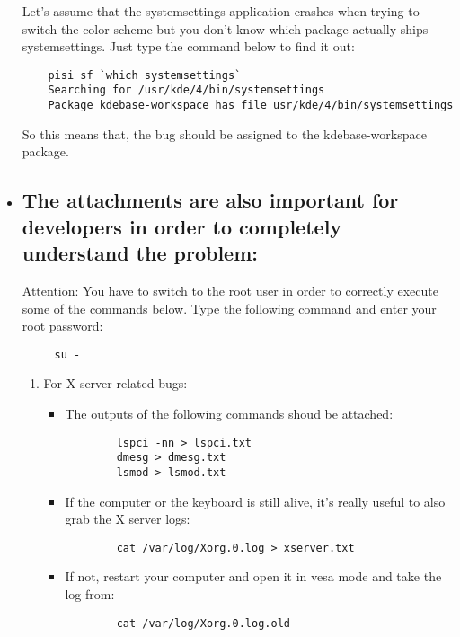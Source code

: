 \documentclass[a4paper,10pt]{article}
\begin{document}
\begin{itemize}
	Let's assume that the systemsettings application crashes when trying to switch the color scheme but you don't know which package actually ships systemsettings. Just type the command below to find it out:
	\begin{verbatim}
	pisi sf `which systemsettings`
	Searching for /usr/kde/4/bin/systemsettings
	Package kdebase-workspace has file usr/kde/4/bin/systemsettings
	\end{verbatim}
	So this means that, the bug should be assigned to the kdebase-workspace package.

  \item \subsection*{The attachments are also important for developers in order to completely understand the problem:}

	Attention: You have to switch to the root user in order to correctly execute some of the commands below. Type the following command and enter your root password:
	\begin{verbatim}
	 su -
	\end{verbatim}

	\begin{enumerate}
	\item For X server related bugs:
	\begin{itemize}
		\item The outputs of the following commands shoud be attached:
		\begin{verbatim}
		lspci -nn > lspci.txt
		dmesg > dmesg.txt
		lsmod > lsmod.txt
		\end{verbatim}
		\item If the computer or the keyboard is still alive, it's really useful to also grab the X server logs:
		\begin{verbatim}
		cat /var/log/Xorg.0.log > xserver.txt
		\end{verbatim}
		\item If not, restart your computer and open it in vesa mode and take the log from:
		\begin{verbatim}
		cat /var/log/Xorg.0.log.old
		\end{verbatim}


\end{itemize}
\end{enumerate}
\end{itemize}
\end{document}
